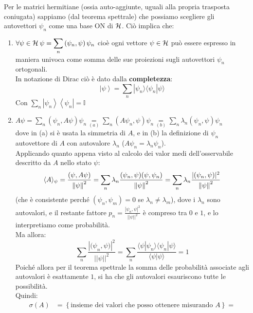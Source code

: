 Per le matrici hermitiane (ossia auto-aggiunte, uguali alla propria trasposta coniugata) sappiamo (dal teorema spettrale) che possiamo scegliere gli autovettori $\psi_n$ come una base ON di $\mathcal{H}$. Ciò implica che:
\begin{enumerate}
    \item $\displaystyle \forall \psi \in \mathcal{H} \> \psi = \sum_{n}{\left(\psi_n, \psi\right)\psi_n}$
    cioè ogni vettore $\psi \in \mathcal{H}$ può essere espresso in maniera univoca come somma delle sue proiezioni sugli autovettori $\psi_n$ ortogonali.\\
    In notazione di Dirac ciò è dato dalla \textbf{completezza}:
    \[
	\left|\psi\right\rangle=\sum_{n}{|\psi_n\rangle \langle\psi_n|\psi\rangle }
	\]
	Con $\sum_{n}{\left|\psi_n\right\rangle\left\langle\psi_n\right|=\mathbb{I}}$
	\item $\displaystyle A\psi = \sum_{n}{\left(\psi_n, A\psi\right)\psi_n \underset{(a)}{=} \sum_{n}{\left(A\psi_n, \psi\right)\psi_n \underset{(b)}{=}\sum_{n}{\lambda_n\left(\psi_n, \psi\right)\psi_n}}}$\\
	dove in (a) si è usata la simmetria di $A$, e in (b) la definizione di $\psi_n$ autovettore di $A$ con autovalore $\lambda_n$ ($A\psi_n = \lambda_n \psi_n$).\\
	Applicando quanto appena visto al calcolo dei valor medi dell'osservabile descritto da $A$ nello stato $\psi$:
	\[
	\langle A \rangle_\psi = \frac{(\psi,A\psi)}{\left\lVert\psi\right\rVert^2} = \sum_n \lambda_n \frac{(\psi_n, \psi)(\psi, \psi_n)}{\left\lVert\psi\right\rVert^2} = \sum_n \lambda_n \frac{|(\psi_n, \psi)|^2}{\left\lVert\psi\right\rVert^2}
	\]
	(che è consistente perché $\left(\psi_n, \psi_m\right)=0$ se $\lambda_n\neq \lambda_m$), dove i $\lambda_n$ sono autovalori, e il restante fattore $\displaystyle p_n = \frac{\left|\psi_n,\psi\right|^2}{\left|\left|\psi\right|\right|^2}$ è compreso tra $0$ e $1$, e lo interpretiamo come probabilità.\\
	Ma allora:
	\[
	\sum_{n}{\frac{\left|{(\psi}_n, \psi)\right|^2}{\left|\left|\psi\right|\right|^2}=\sum_{n}\frac{\langle\psi|\psi_n\rangle \langle\psi_n|\psi\rangle }{\langle\psi|\psi\rangle }=1 }
	\]
	Poiché allora per il teorema spettrale la somma delle probabilità associate agli autovalori è esattamente $1$, si ha che gli autovalori esauriscono tutte le possibilità.\\
	Quindi:
	\begin{align*}
	    \sigma \left(A\right)&=\left\{\text {insieme dei valori che posso ottenere misurando } A\right\}= \\

\end{align*}
\end{enumerate}
